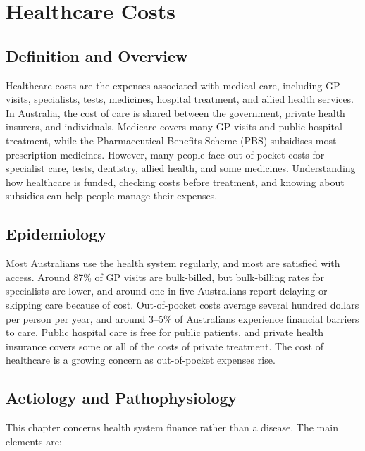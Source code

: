 \chapter{Healthcare Costs}

\section*{Definition and Overview}
Healthcare costs are the expenses associated with medical care, including GP visits, specialists, tests, medicines, hospital treatment, and allied health services. In Australia, the cost of care is shared between the government, private health insurers, and individuals. Medicare covers many GP visits and public hospital treatment, while the Pharmaceutical Benefits Scheme (PBS) subsidises most prescription medicines. However, many people face out-of-pocket costs for specialist care, tests, dentistry, allied health, and some medicines. Understanding how healthcare is funded, checking costs before treatment, and knowing about subsidies can help people manage their expenses.

\section*{Epidemiology}
Most Australians use the health system regularly, and most are satisfied with access. Around 87\% of GP visits are bulk-billed, but bulk-billing rates for specialists are lower, and around one in five Australians report delaying or skipping care because of cost. Out-of-pocket costs average several hundred dollars per person per year, and around 3--5\% of Australians experience financial barriers to care. Public hospital care is free for public patients, and private health insurance covers some or all of the costs of private treatment. The cost of healthcare is a growing concern as out-of-pocket expenses rise.

\section*{Aetiology and Pathophysiology}
This chapter concerns health system finance rather than a disease. The main elements are:

